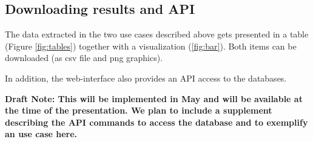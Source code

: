 \subsection{Downloading results and API}

The data extracted in the two use cases described above gets presented in a table (Figure \ref{fig:tables}) together with a visualization (\ref{fig:bar}). Both items can be downloaded (as csv file and png graphics).

In addition, the web-interface also provides an API access to the databases. 

\textbf{Draft Note: This will be implemented in May and will be available at the time of the presentation. We plan to include a supplement describing the API commands to access the database and to exemplify  an use case here.}

